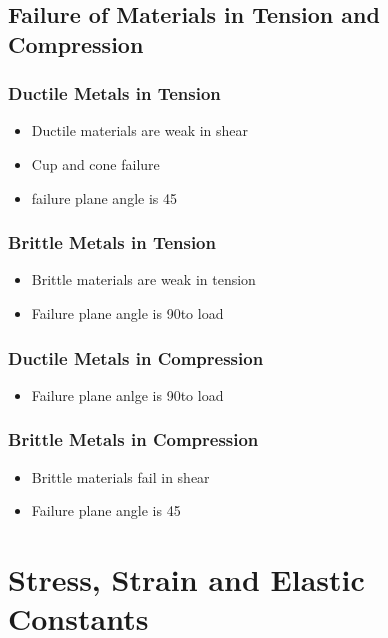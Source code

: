 \documentclass[8pt]{report}
\begin{document}
\section{Failure of Materials in Tension and Compression}
	\subsection{Ductile Metals in Tension}
		\begin{itemize}
			\item Ductile materials are weak in shear
			\item Cup and cone failure
			\item failure plane angle is 45\textdegree
		\end{itemize}\hrulefill
	\subsection{Brittle Metals in Tension}
		\begin{itemize}
			\item Brittle materials are weak in tension
			\item Failure plane angle is 90\textdegree to load
		\end{itemize}\hrulefill
	\subsection{Ductile Metals in Compression}
		\begin{itemize}
			\item Failure plane anlge is 90\textdegree to load
		\end{itemize}\hrulefill
	\subsection{Brittle Metals in Compression}
		\begin{itemize}
			\item Brittle materials fail in shear
			\item Failure plane angle is 45\textdegree
		\end{itemize}\hrulefill
\chapter{Stress, Strain and Elastic Constants}
\end{document}
